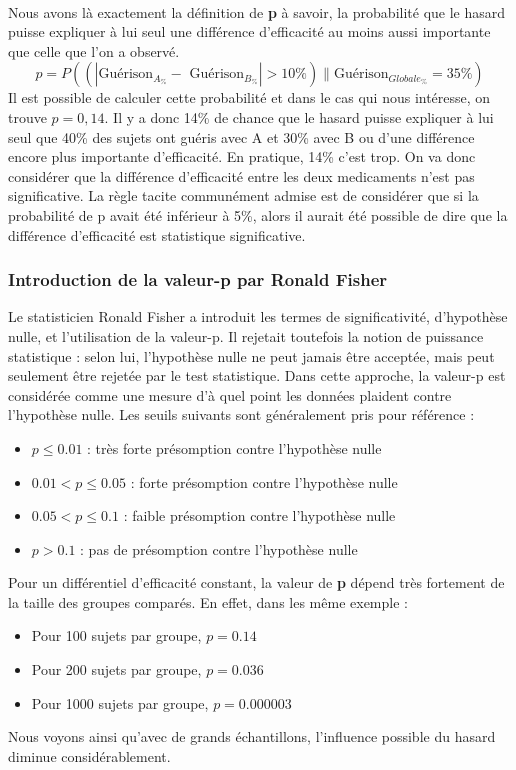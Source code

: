 \\
Nous avons là exactement la définition de \textbf{p} à savoir, la probabilité que le hasard puisse expliquer à lui seul une différence d'efficacité au moins aussi importante que celle que l'on a observé. 
$$p = P\left((|\textrm{Guérison}_{A_{\%}} - \textrm{ Guérison}_{B_{\%}}|>10\%)\|\textrm{Guérison}_{Globale_{\%}} = 35\%\right)$$
Il est possible de calculer cette probabilité et dans le cas qui nous intéresse, on trouve $p=0,14$.\newline
Il y a donc 14\% de chance que le hasard puisse expliquer à lui seul que 40\% des sujets ont guéris avec A et 30\% avec B ou d'une différence encore plus importante d'efficacité.\newline
En pratique, 14\% c'est trop. On va donc considérer que la différence d'efficacité entre les deux medicaments n'est pas significative. La règle tacite communément admise est de considérer que si la probabilité de p avait été inférieur à 5\%, alors il aurait été possible de dire que la différence d'efficacité est statistique significative. 
\subsubsection*{Introduction de la valeur-p par Ronald Fisher}
Le statisticien Ronald Fisher a introduit les termes de significativité, d'hypothèse nulle, et l'utilisation de la valeur-p. Il rejetait toutefois la notion de puissance statistique : selon lui, l'hypothèse nulle ne peut jamais être acceptée, mais peut seulement être rejetée par le test statistique. Dans cette approche, la valeur-p est considérée comme une mesure d'à quel point les données plaident contre l'hypothèse nulle. Les seuils suivants sont généralement pris pour référence :
\begin{itemize}
\item   $p\leq 0.01$ : très forte présomption contre l'hypothèse nulle
\item $ 0.01<p\leq 0.05$ : forte présomption contre l'hypothèse nulle
\item $0.05<p\leq 0.1$ : faible présomption contre l'hypothèse nulle
\item $ p>0.1$ : pas de présomption contre l'hypothèse nulle
\end{itemize}
Pour un différentiel d'efficacité constant, la valeur de \textbf{p} dépend très fortement de la taille des groupes comparés. En effet, dans les même exemple : 
\begin{itemize}
\item Pour 100 sujets par groupe, $p=0.14$
\item Pour 200 sujets par groupe, $p=0.036$
\item Pour 1000 sujets par groupe, $p=0.000003$
\end{itemize}
Nous voyons ainsi qu'avec de grands échantillons, l'influence possible du hasard diminue considérablement.
\newpage
